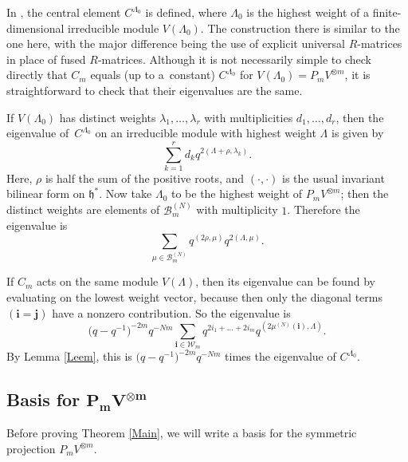 \documentclass[11pt]{article}
\numberwithin{equation}{section}
\numberwithin{equation}{section}
\newcommand{\ii}{{\mathbf{i}}}
\newcommand{\jj}{{\mathbf{j}}}
\begin{document}
\setcounter{Theorem}{3}
\begin{Remark}\label{Remark1}
In \cite{ZGBJPhysA}, the central element $C^{\Lambda_0}$ is defined, where $\Lambda_0$ is the highest weight of a finite-dimensional irreducible module $V(\Lambda_0)$. The construction there is similar to the one here, with the major difference being the use of explicit universal $R$-matrices in place of fused $R$-matrices. Although it is not necessarily simple to check directly that $C_m$ equals (up to a~constant) $C^{\Lambda_0}$ for $V(\Lambda_0)=P_mV^{\otimes m}$, it is straightforward to check that their eigenvalues are the same.

If $V(\Lambda_0)$ has distinct weights $\lambda_1,\dots,\lambda_r$ with multiplicities $d_1,\dots,d_r$, then the eigenvalue of~$C^{\Lambda_0}$ on an irreducible module with highest weight $\Lambda$ is given by
\[
\sum_{k=1}^r d_k q^{2(\Lambda + \rho,\lambda_k)}.
\]
Here, $\rho$ is half the sum of the positive roots, and $(\cdot,\cdot)$ is the usual invariant bilinear form on $\mathfrak{h}^*$. Now take $\Lambda_0$ to be the highest weight of $P_mV^{\otimes m}$; then the distinct weights are elements of $\mathcal{B}^{(N)}_m$ with multiplicity $1$. Therefore the eigenvalue is
\[
\sum_{\mu \in \mathcal{B}^{(N)}_m} q^{(2\rho,\mu)}q^{2(\Lambda,\mu)}.
\]

If $C_m$ acts on the same module $V(\Lambda)$, then its eigenvalue can be found by evaluating on the lowest weight vector, because then only the diagonal terms $(\ii=\jj)$ have a nonzero contribution. So the eigenvalue is
\[
\big(q-q^{-1}\big)^{-2m}q^{-Nm}\sum_{\ii \in \mathcal{W}_m} q^{ 2i_1 + \dots + 2i_m} q^{(2\mu^{(N)}(\ii),\Lambda)}.
\]
By Lemma \ref{Leem}, this is $\big(q-q^{-1}\big)^{-2m}q^{-Nm}$ times the eigenvalue of $C^{\Lambda_0}$.
\end{Remark}

\setcounter{Theorem}{5}
\subsection[Basis for P\_mV\^\{otimes m\}]{Basis for $\boldsymbol{P_mV^{\otimes m}}$}

Before proving Theorem \ref{Main}, we will write a basis for the symmetric projection $P_mV^{\otimes m}$.
\end{document}
